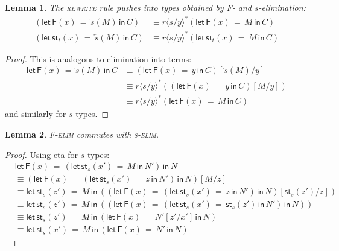 \documentclass[10pt]{article}
\newtheorem{lemma}{Lemma}
\theoremstyle{definition}
\newcommand{\rewrite}[2]{\overleftarrow{#1}(#2)}
\newcommand\St[2]{\ensuremath{{#1}^*(#2)}}
\newcommand\StI[2]{\ensuremath{\mathsf{st}_{#1}(#2)}}
\newcommand\StE[4]{\ensuremath{\mathsf{let} \, \StI{#1}{#3} \, = \, {#2} \, \mathsf{in} \, #4}}
\newcommand\FE[3]{\ensuremath{\mathsf{let} \, \mathsf{F}(#2) \, = \, {#1} \, \mathsf{in} \, #3}}
\newcommand\FEs[4]{\ensuremath{\mathsf{let} \, \mathsf{F}_{#1}(#3) \, = \, {#2} \, \mathsf{in} \, #4}}
\newcommand\TrPlus[2]{\ensuremath{{#1}^+(#2)}}
\newcommand\ap[2]{\ensuremath{#1 \langle #2 \rangle }}
\begin{document}
\begin{lemma}
The \textsc{rewrite} rule pushes into types obtained by \textsf{F}- and $s$-elimination:
\begin{align*}
(\FE{\rewrite{s}{M}}{x}{C}) &\equiv \St{\ap{r}{s/y}}{\FE{M}{x}{C}} \\
(\StE{t}{\rewrite{s}{M}}{x}{C}) &\equiv \St{\ap{r}{s/y}}{\StE{t}{M}{x}{C}}
\end{align*}
\end{lemma}
\begin{proof}
This is analogous to elimination into terms:
\begin{align*}
\FE{\rewrite{s}{M}}{x}{C}
&\equiv (\FE{y}{x}{C})[\rewrite{s}{M}/y] \\
&\equiv \St{\ap{r}{s/y}}{(\FE{y}{x}{C})[M/y]} \\
&\equiv \St{\ap{r}{s/y}}{\FE{M}{x}{C}}
\end{align*}
and similarly for $s$-types.
\end{proof}

\begin{lemma}
\textsc{F-elim} commutes with \textsc{s-elim}.
\end{lemma}
\begin{proof}
Using eta for $s$-types:
\begin{align*}
&\FE{(\StE{s}{M}{x'}{N'})}{x}{N} \\
&\equiv (\FE{(\StE{s}{z}{x'}{N'})}{x}{N})[M/z] \\
&\equiv \StE{s}{M}{z'}{((\FE{(\StE{s}{z}{x'}{N'})}{x}{N})[\StI{s}{z'}/z])} \\
&\equiv \StE{s}{M}{z'}{((\FE{(\StE{s}{\StI{s}{z'}}{x'}{N'})}{x}{N}))} \\
&\equiv \StE{s}{M}{z'}{(\FE{N'[z'/x']}{x}{N})} \\
&\equiv \StE{s}{M}{x'}{(\FE{N'}{x}{N})}
\end{align*}
\end{proof}

\end{document}
